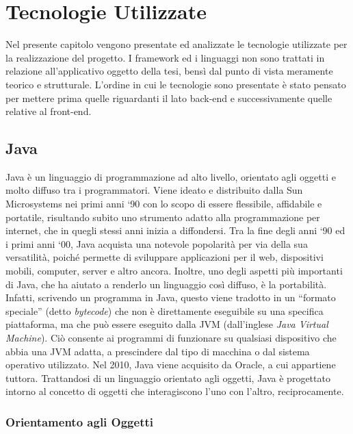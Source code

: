 \chapter{Tecnologie Utilizzate}
\label{chap:Tecnologie Utilizzate}

Nel presente capitolo vengono presentate ed analizzate le tecnologie utilizzate per la realizzazione del progetto. I framework ed i linguaggi non sono trattati in relazione all’applicativo oggetto della tesi, bensì dal punto di vista meramente teorico e strutturale. 
L’ordine in cui le tecnologie sono presentate è stato pensato per mettere prima quelle riguardanti il lato back-end e successivamente quelle relative al front-end.

\section{Java}

Java è un linguaggio di programmazione ad alto livello, orientato agli oggetti e molto diffuso tra i programmatori. Viene ideato e distribuito dalla Sun Microsystems nei primi anni ‘90 con lo scopo di essere flessibile, affidabile e portatile, risultando subito uno strumento adatto alla programmazione per internet, che in quegli stessi anni inizia a diffondersi.
Tra la fine degli anni ‘90 ed i primi anni ‘00, Java acquista una notevole popolarità per via della sua versatilità, poiché permette di sviluppare applicazioni per il web, dispositivi mobili, computer, server e altro ancora. Inoltre, uno degli aspetti più importanti di Java, che ha aiutato a renderlo un linguaggio così diffuso, è la portabilità. Infatti, scrivendo un programma in Java, questo viene tradotto in un “formato speciale” (detto \textit{bytecode}) che non è direttamente eseguibile su una specifica piattaforma, ma che può essere eseguito dalla JVM (dall’inglese \textit{Java Virtual Machine}). Ciò consente ai programmi di funzionare su qualsiasi dispositivo che abbia una JVM adatta, a prescindere dal tipo di macchina o dal sistema operativo utilizzato. Nel 2010, Java viene acquisito da Oracle, a cui appartiene tuttora.\cite{JAVA_webopedia}\cite{JAVA_java}
Trattandosi di un linguaggio orientato agli oggetti, Java è progettato intorno al concetto di oggetti che interagiscono l’uno con l’altro, reciprocamente.

\subsection{Orientamento agli Oggetti}

